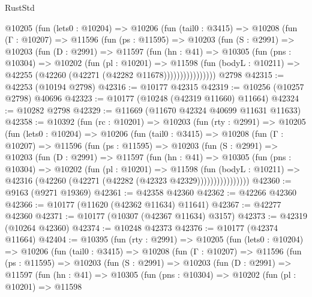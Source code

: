 \begin{lexlean}{RustStd}
\begin{coremodule}
        @10205
          (fun (lets0 : @10204) =>
          @10206
            (fun (tail0 : @3415) =>
            @10208
              (fun (Γ : @10207) =>
              @11596
                (fun (ps : @11595) =>
                @10203
                  (fun (S : @2991) =>
                  @10203
                    (fun (D : @2991) =>
                    @11597
                      (fun (hn : @41) =>
                      @10305
                        (fun (pns : @10304) =>
                        @10202
                          (fun (pl : @10201) =>
                          @11598
                            (fun (bodyL : @10211) =>
                            @42255 (@42260 (@42271 (@42282 @11678))))))))))))))))
    @2798
@42315 := @42253 (@10194 @2798)
@42316 := @10177 @42315
@42319 := @10256 (@10257 @2798) @40696
@42323 := @10177 (@10248 (@42319 @11660) @11664)
@42324 := @10282 @2798
@42329 := @11669 (@11670 @42324 @40699 @11631 @11633)
@42358 := @10392
    (fun (rc : @10201) =>
    @10203
      (fun (rty : @2991) =>
      @10205
        (fun (lets0 : @10204) =>
        @10206
          (fun (tail0 : @3415) =>
          @10208
            (fun (Γ : @10207) =>
            @11596
              (fun (ps : @11595) =>
              @10203
                (fun (S : @2991) =>
                @10203
                  (fun (D : @2991) =>
                  @11597
                    (fun (hn : @41) =>
                    @10305
                      (fun (pns : @10304) =>
                      @10202
                        (fun (pl : @10201) =>
                        @11598
                          (fun (bodyL : @10211) =>
                          @42316 (@42260 (@42271 (@42282 (@42323 @42329))))))))))))))))
@42360 := @9163 (@9271 @19369)
@42361 := @42358 @42360
@42362 := @42266 @42360
@42366 := @10177 (@11620 (@42362 @11634) @11641)
@42367 := @42277 @42360
@42371 := @10177 (@10307 (@42367 @11634) @3157)
@42373 := @42319 (@10264 @42360)
@42374 := @10248 @42373
@42376 := @10177 (@42374 @11664)
@42404 := @10395
    (fun (rty : @2991) =>
    @10205
      (fun (lets0 : @10204) =>
      @10206
        (fun (tail0 : @3415) =>
        @10208
          (fun (Γ : @10207) =>
          @11596
            (fun (ps : @11595) =>
            @10203
              (fun (S : @2991) =>
              @10203
                (fun (D : @2991) =>
                @11597
                  (fun (hn : @41) =>
                  @10305
                    (fun (pns : @10304) =>
                    @10202
                      (fun (pl : @10201) =>
                      @11598

\end{coremodule}
\end{lexlean}
